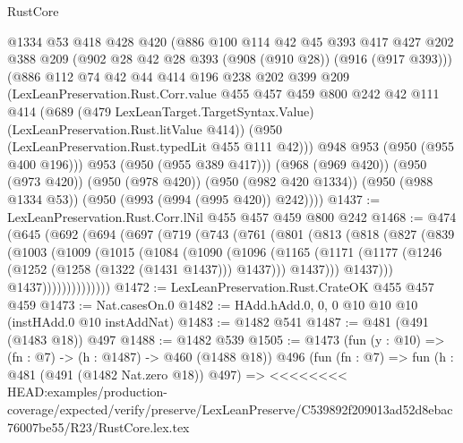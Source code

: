 \begin{lexlean}{RustCore}
\begin{coremodule}
{\begin{coremodule}
{{{{{        @1334
        @53
        @418
        @428
        @420
        (@886
          @100
          @114
          @42
          @45
          @393
          @417
          @427
          @202
          @388
          @209
          (@902 @28 @42 @28 @393 (@908 (@910 @28)) (@916 (@917 @393)))
          (@886
            @112
            @74
            @42
            @44
            @414
            @196
            @238
            @202
            @399
            @209
            (LexLeanPreservation.Rust.Corr.value
              @455
              @457
              @459
              @800
              @242
              @42
              @111
              @414
              (@689
                (@479 LexLeanTarget.TargetSyntax.Value)
                (LexLeanPreservation.Rust.litValue @414))
              (@950 (LexLeanPreservation.Rust.typedLit @455 @111 @42)))
            @948
            @953
            (@950 (@955 @400 @196)))
          @953
          (@950 (@955 @389 @417)))
        (@968 (@969 @420))
        (@950 (@973 @420))
        (@950 (@978 @420))
        (@950 (@982 @420 @1334))
        (@950 (@988 @1334 @53))
        (@950 (@993 (@994 (@995 @420)) @242))))
@1437 := LexLeanPreservation.Rust.Corr.lNil @455 @457 @459 @800 @242
@1468 := @474
    (@645
      (@692
        (@694
          (@697
            (@719
              (@743
                (@761
                  (@801
                    (@813
                      (@818
                        (@827
                          (@839
                            (@1003
                              (@1009
                                (@1015
                                  (@1084
                                    (@1090
                                      (@1096
                                        (@1165
                                          (@1171
                                            (@1177
                                              (@1246 (@1252 (@1258 (@1322 (@1431 @1437))) @1437)))
                                            @1437)))
                                      @1437)))
                                @1437))))))))))))))
@1472 := LexLeanPreservation.Rust.CrateOK @455 @457 @459
@1473 := Nat.casesOn.{0}
@1482 := HAdd.hAdd.{0, 0, 0} @10 @10 @10 (instHAdd.{0} @10 instAddNat)
@1483 := @1482 @541
@1487 := @481 (@491 (@1483 @18)) @497
@1488 := @1482 @539
@1505 := @1473
    (fun (y : @10) => (fn : @7) -> (h : @1487) -> @460 (@1488 @18))
    @496
    (fun (fn : @7) =>
    fun (h : @481 (@491 (@1482 Nat.zero @18)) @497) =>
<<<<<<<< HEAD:examples/production-coverage/expected/verify/preserve/LexLeanPreserve/C539892f209013ad52d8ebac76007be55/R23/RustCore.lex.tex
}}}}}
\end{coremodule}}
\end{coremodule}
\end{lexlean}
